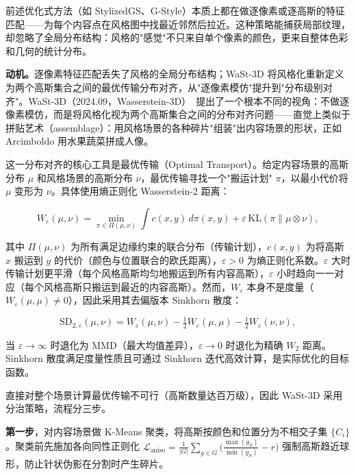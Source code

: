 前述优化式方法（如 StylizedGS、G-Style）本质上都在做逐像素或逐高斯的特征匹配——为每个内容点在风格图中找最近邻然后拉近。这种策略能捕获局部纹理，却忽略了全局分布结构：风格的"感觉"不只来自单个像素的颜色，更来自整体色彩和几何的统计分布。

\textbf{动机。}逐像素特征匹配丢失了风格的全局分布结构；WaSt-3D 将风格化重新定义为两个高斯集合之间的最优传输分布对齐，从"逐像素模仿"提升到"分布级别对齐"。WaSt-3D（2024.09，Wasserstein-3D）~\cite{2409_17917}提出了一个根本不同的视角：不做逐像素模仿，而是将风格化视为两个高斯集合之间的分布对齐问题——直觉上类似于拼贴艺术（assemblage）：用风格场景的各种碎片"组装"出内容场景的形状，正如 Arcimboldo 用水果蔬菜拼成人像。

这一分布对齐的核心工具是最优传输（Optimal Transport）。给定内容场景的高斯分布 $\mu$ 和风格场景的高斯分布 $\nu$，最优传输寻找一个"搬运计划" $\pi$，以最小代价将 $\mu$ 变形为 $\nu$。具体使用熵正则化 Wasserstein-2 距离：

\begin{equation}
  W_\varepsilon(\mu, \nu) = \min_{\pi \in \Pi(\mu,\nu)} \int c(x,y) \, d\pi(x,y) + \varepsilon \, \text{KL}(\pi \| \mu \otimes \nu),
\end{equation}

其中 $\Pi(\mu,\nu)$ 为所有满足边缘约束的联合分布（传输计划），$c(x,y)$ 为将高斯 $x$ 搬运到 $y$ 的代价（颜色与位置联合的欧氏距离），$\varepsilon > 0$ 为熵正则化系数。$\varepsilon$ 大时传输计划更平滑（每个风格高斯均匀地搬运到所有内容高斯），$\varepsilon$ 小时趋向一一对应（每个风格高斯只搬运到最近的内容高斯）。然而，$W_\varepsilon$ 本身不是度量（$W_\varepsilon(\mu,\mu) \neq 0$），因此采用其去偏版本 Sinkhorn 散度：

\begin{equation}
  \text{SD}_{2,\varepsilon}(\mu, \nu) = W_\varepsilon(\mu, \nu) - \tfrac{1}{2}W_\varepsilon(\mu, \mu) - \tfrac{1}{2}W_\varepsilon(\nu, \nu),
\end{equation}

当 $\varepsilon \to \infty$ 时退化为 MMD（最大均值差异），$\varepsilon \to 0$ 时退化为精确 $W_2$ 距离。Sinkhorn 散度满足度量性质且可通过 Sinkhorn 迭代高效计算，是实际优化的目标函数。

直接对整个场景计算最优传输不可行（高斯数量达百万级），因此 WaSt-3D 采用分治策略，流程分三步。

\textbf{第一步}，对内容场景做 K-Means 聚类，将高斯按颜色和位置分为不相交子集 $\{C_i\}$。聚类前先施加各向同性正则化 $\mathcal{L}_{\text{aniso}} = \frac{1}{|G|}\sum_{g \in G}\bigl(\frac{\max(g_S)}{\min(g_S)} - r\bigr)$ 强制高斯趋近球形，防止针状伪影在分割时产生碎片。

